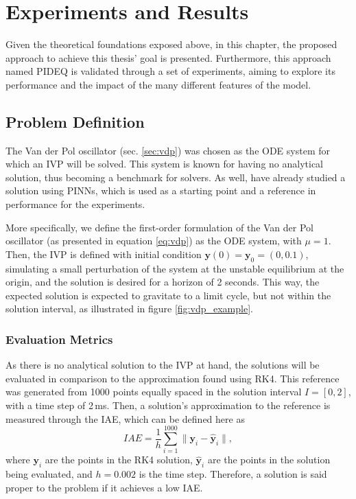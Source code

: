 \chapter{Experiments and Results}\label{ch:experiments}

Given the theoretical foundations exposed above, in this chapter, the proposed approach to achieve this thesis' goal is presented.
Furthermore, this approach named \gls{PIDEQ} is validated through a set of experiments, aiming to explore its performance and the impact of the many different features of the model.

\section{Problem Definition}

The Van der Pol oscillator (sec. \ref{sec:vdp}) was chosen as the \gls{ODE} system for which an \gls{IVP} will be solved.
This system is known for having no analytical solution, thus becoming a benchmark for solvers.
As well, \textcite{Antonelo2021} have already studied a solution using \gls{PINN}s, which is used as a starting point and a reference in performance for the experiments.

More specifically, we define the first-order formulation of the Van der Pol oscillator (as presented in equation \eqref{eq:vdp}) as the \gls{ODE} system, with $\mu=1$.
Then, the \gls{IVP} is defined with initial condition $\bm{y}(0) = \bm{y}_0 = \left( 0, 0.1 \right) $, simulating a small perturbation of the system at the unstable equilibrium at the origin, and the solution is desired for a horizon of 2 seconds. 
This way, the expected solution is expected to gravitate to a limit cycle, but not within the solution interval, as illustrated in figure \ref{fig:vdp_example}.

\subsection{Evaluation Metrics}

As there is no analytical solution to the \gls{IVP} at hand, the solutions will be evaluated in comparison to the approximation found using \gls{RK4}.
This reference was generated from 1000 points equally spaced in the solution interval $I=[0,2]$, with a time step of 2\,ms\footnotemark.
Then, a solution's approximation to the reference is measured through the \gls{IAE}, which can be defined here as \[
    IAE = \frac{1}{h}\sum_{i=1}^{1000} \|\bm{y}_i - \hat{\bm{y}}_i\|
,\] where $\bm{y}_i$ are the points in the \gls{RK4} solution,  $\hat{\bm{y}}_i$ are the points in the solution being evaluated, and $h=0.002$ is the time step.
Therefore, a solution is said proper to the problem if it achieves a low \gls{IAE}.

